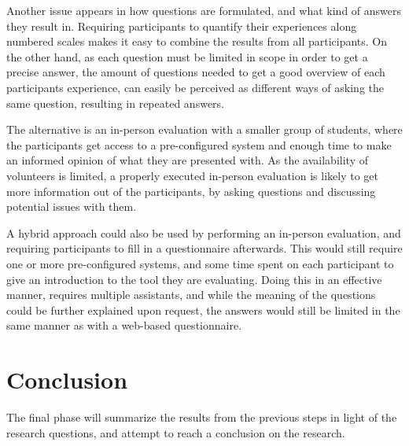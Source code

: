 Another issue appears in how questions are formulated, and what kind of answers they result in.
Requiring participants to quantify their experiences along numbered scales makes it easy to combine the results from all participants.
On the other hand, as each question must be limited in scope in order to get a precise answer, the amount of questions needed to get a good overview of each participants experience, can easily be perceived as different ways of asking the same question, resulting in repeated answers.

The alternative is an in-person evaluation with a smaller group of students, where the participants get access to a pre-configured system and enough time to make an informed opinion of what they are presented with.
As the availability of volunteers is limited, a properly executed in-person evaluation is likely to get more information out of the participants, by asking questions and discussing potential issues with them.

A hybrid approach could also be used by performing an in-person evaluation, and requiring participants to fill in a questionnaire afterwards.
This would still require one or more pre-configured systems, and some time spent on each participant to give an introduction to the tool they are evaluating.
Doing this in an effective manner, requires multiple assistants, and while the meaning of the questions could be further explained upon request, the answers would still be limited in the same manner as with a web-based questionnaire.

\section{Conclusion}\label{methConclude}

The final phase will summarize the results from the previous steps in light of the research questions, and attempt to reach a conclusion on the research.










